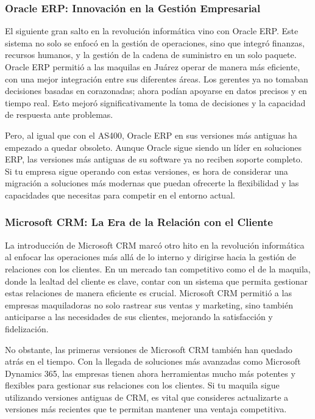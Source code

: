 \documentclass[
  10pt,
  letterpaper,
]{book}
\begin{document}
\subsubsection{Oracle ERP: Innovación en la Gestión
Empresarial}\label{oracle-erp-innovaciuxf3n-en-la-gestiuxf3n-empresarial}

El siguiente gran salto en la revolución informática vino con Oracle
ERP. Este sistema no solo se enfocó en la gestión de operaciones, sino
que integró finanzas, recursos humanos, y la gestión de la cadena de
suministro en un solo paquete. Oracle ERP permitió a las maquilas en
Juárez operar de manera más eficiente, con una mejor integración entre
sus diferentes áreas. Los gerentes ya no tomaban decisiones basadas en
corazonadas; ahora podían apoyarse en datos precisos y en tiempo real.
Esto mejoró significativamente la toma de decisiones y la capacidad de
respuesta ante problemas.

Pero, al igual que con el AS400, Oracle ERP en sus versiones más
antiguas ha empezado a quedar obsoleto. Aunque Oracle sigue siendo un
líder en soluciones ERP, las versiones más antiguas de su software ya no
reciben soporte completo. Si tu empresa sigue operando con estas
versiones, es hora de considerar una migración a soluciones más modernas
que puedan ofrecerte la flexibilidad y las capacidades que necesitas
para competir en el entorno actual.

\subsubsection{Microsoft CRM: La Era de la Relación con el
Cliente}\label{microsoft-crm-la-era-de-la-relaciuxf3n-con-el-cliente}

La introducción de Microsoft CRM marcó otro hito en la revolución
informática al enfocar las operaciones más allá de lo interno y
dirigirse hacia la gestión de relaciones con los clientes. En un mercado
tan competitivo como el de la maquila, donde la lealtad del cliente es
clave, contar con un sistema que permita gestionar estas relaciones de
manera eficiente es crucial. Microsoft CRM permitió a las empresas
maquiladoras no solo rastrear sus ventas y marketing, sino también
anticiparse a las necesidades de sus clientes, mejorando la satisfacción
y fidelización.

No obstante, las primeras versiones de Microsoft CRM también han quedado
atrás en el tiempo. Con la llegada de soluciones más avanzadas como
Microsoft Dynamics 365, las empresas tienen ahora herramientas mucho más
potentes y flexibles para gestionar sus relaciones con los clientes. Si
tu maquila sigue utilizando versiones antiguas de CRM, es vital que
consideres actualizarte a versiones más recientes que te permitan
mantener una ventaja competitiva.
\end{document}
